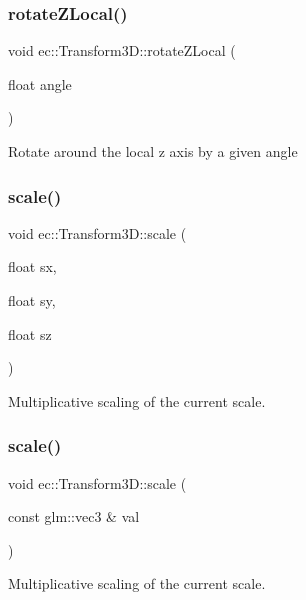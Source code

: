 \subsubsection{\texorpdfstring{rotate\+Z\+Local()}{rotateZLocal()}}
{\footnotesize\ttfamily void ec\+::\+Transform3\+D\+::rotate\+Z\+Local (\begin{DoxyParamCaption}\item[{float}]{angle }\end{DoxyParamCaption})}

Rotate around the local z axis by a given angle \mbox{\label{classec_1_1_transform3_d_a3f4636cea71bac0aa965bc567e649e03}} 
\subsubsection{\texorpdfstring{scale()}{scale()}\hspace{0.1cm}{\footnotesize\ttfamily [1/3]}}
{\footnotesize\ttfamily void ec\+::\+Transform3\+D\+::scale (\begin{DoxyParamCaption}\item[{float}]{sx,  }\item[{float}]{sy,  }\item[{float}]{sz }\end{DoxyParamCaption})}

Multiplicative scaling of the current scale. \mbox{\label{classec_1_1_transform3_d_a5ddb66479416948acf2406f544aaaa0f}} 
\subsubsection{\texorpdfstring{scale()}{scale()}\hspace{0.1cm}{\footnotesize\ttfamily [2/3]}}
{\footnotesize\ttfamily void ec\+::\+Transform3\+D\+::scale (\begin{DoxyParamCaption}\item[{const glm\+::vec3 \&}]{val }\end{DoxyParamCaption})}

Multiplicative scaling of the current scale. \mbox{\label{classec_1_1_transform3_d_af4798de480a697351333d068a90ab69e}} 
